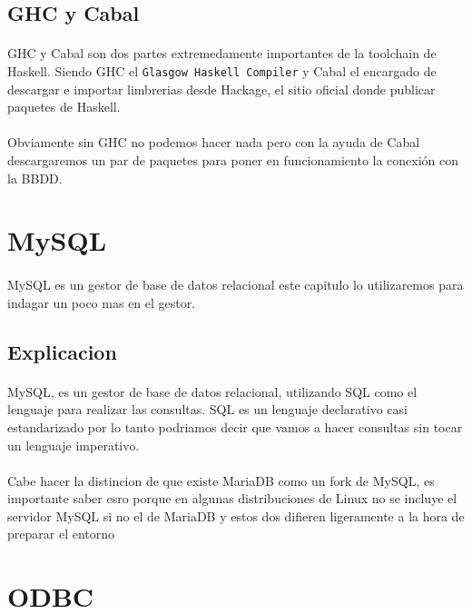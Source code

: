 \documentclass{article}
\begin{document}
	\subsection{GHC y Cabal}
		\paragraph{} GHC y Cabal son dos partes extremedamente importantes de la toolchain de Haskell. Siendo GHC el \verb+Glasgow Haskell Compiler+ y Cabal el encargado de descargar e importar limbrerias desde Hackage, el sitio oficial donde publicar paquetes de Haskell.
		\paragraph{} Obviamente sin GHC no podemos hacer nada pero con la ayuda de Cabal descargaremos un par de paquetes para poner en funcionamiento la conexión con la BBDD.
\section{MySQL}
	\paragraph{} {\huge M}ySQL es un gestor de base de datos relacional este capitulo lo utilizaremos para indagar un poco mas en el gestor.
	\subsection{Explicacion}
		\paragraph{} MySQL, es un gestor de base de datos relacional, utilizando SQL como el lenguaje para realizar las consultas. SQL es un lenguaje declarativo casi estandarizado por lo tanto podriamos decir que vamos a hacer consultas sin tocar un lenguaje imperativo.

	\paragraph{} Cabe hacer la distincion de que existe MariaDB como un fork de MySQL, es importante saber esro porque en algunas distribuciones de Linux no se incluye el servidor MySQL si no el de MariaDB y estos dos difieren ligeramente a la hora de preparar el entorno

\section{ODBC}
\end{document}
